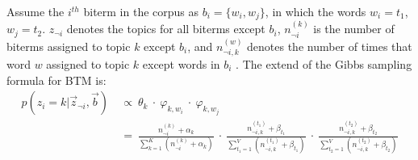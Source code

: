 Assume the $i^{th}$ biterm in the corpus as $b_i=\{w_i,w_j\}$, in which the words $w_i=t_1$, $w_j=t_2$. $z_{\lnot i}$ denotes the topics for all biterms except $b_i$, $n_{\lnot i}^{(k)}$ is the number of biterms assigned to topic $k$ except $b_i$, and $n_{\lnot i,k}^{(w)}$ denotes the number of times that word $w$ assigned to topic $k$ except words in $b_i$ \cite{cheng2014btm}. The extend of the Gibbs sampling formula for BTM is:
\begin{equation}
\begin{aligned}
    p(z_i=k|\vec z_{\lnot i},\vec b)\ &\propto\ \theta_k\ \cdot\ \varphi_{k, w_i}\ \cdot\ \varphi_{k,w_j}\\
    &=\ \frac{n_{\lnot i}^{(k)}+\alpha_k}{\sum_{k=1}^{K}(n_{\lnot i}^{(k)}+\alpha_k)}\ 
    \cdot\ \frac{n_{\lnot i,k}^{(t_1)}+\beta_{t_1}}{\sum_{t_1=1}^{V}(n_{\lnot i,k}^{(t_1)}+\beta_{t_1})}\ 
    \cdot\ \frac{n_{\lnot i,k}^{(t_2)}+\beta_{t_2}}{\sum_{t_2=1}^{V}(n_{\lnot i,k}^{(t_2)}+\beta_{t_2})}
\end{aligned}
\end{equation}

